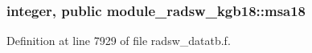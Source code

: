 \subsubsection[{\texorpdfstring{msa18}{msa18}}]{\setlength{\rightskip}{0pt plus 5cm}integer, public module\+\_\+radsw\+\_\+kgb18\+::msa18}\hypertarget{namespacemodule__radsw__kgb18_a48213008c9ed8f94aaad4ef327d38583}{}\label{namespacemodule__radsw__kgb18_a48213008c9ed8f94aaad4ef327d38583}


Definition at line 7929 of file radsw\+\_\+datatb.\+f.


